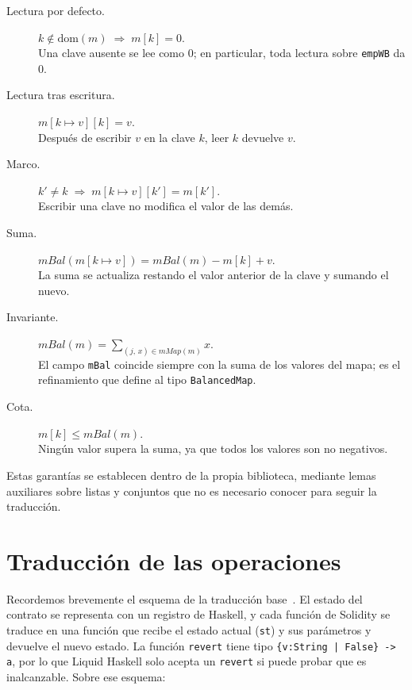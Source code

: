 \begin{description}
  \item[Lectura por defecto.] $k \notin \mathrm{dom}(m) \;\Rightarrow\; m[k] = 0$.\\
    Una clave ausente se lee como $0$; en particular, toda lectura sobre
    \lstinline|empWB| da $0$.
  \item[Lectura tras escritura.] $m[k \mapsto v][k] = v$.\\
    Después de escribir $v$ en la clave $k$, leer $k$ devuelve $v$.
  \item[Marco.] $k' \neq k \;\Rightarrow\; m[k \mapsto v][k'] = m[k']$.\\
    Escribir una clave no modifica el valor de las demás.
  \item[Suma.] $\mathit{mBal}(m[k \mapsto v]) = \mathit{mBal}(m) - m[k] + v$.\\
    La suma se actualiza restando el valor anterior de la clave y sumando el nuevo.
  \item[Invariante.] $\mathit{mBal}(m) = \sum_{(j,\,x) \in \mathit{mMap}(m)} x$.\\
    El campo \lstinline|mBal| coincide siempre con la suma de los valores del mapa;
    es el refinamiento que define al tipo \lstinline|BalancedMap|.
  \item[Cota.] $m[k] \leq \mathit{mBal}(m)$.\\
    Ningún valor supera la suma, ya que todos los valores son no negativos.
\end{description}

Estas garantías se establecen dentro de la propia biblioteca, mediante lemas
auxiliares sobre listas y conjuntos que no es necesario conocer para seguir la
traducción.

\section{Traducción de las operaciones}
\label{sec:mappings-traduccion}

Recordemos brevemente el esquema de la traducción base~\cite{Consoli25}. El estado
del contrato se representa con un registro de Haskell, y cada función de Solidity se
traduce en una función que recibe el estado actual (\lstinline|st|) y sus parámetros
y devuelve el nuevo estado. La función \lstinline|revert| tiene tipo
\lstinline[language=LHaskell]!{v:String | False} -> a!, por lo que Liquid Haskell solo
acepta un \lstinline|revert| si puede probar que es inalcanzable. Sobre ese esquema:

